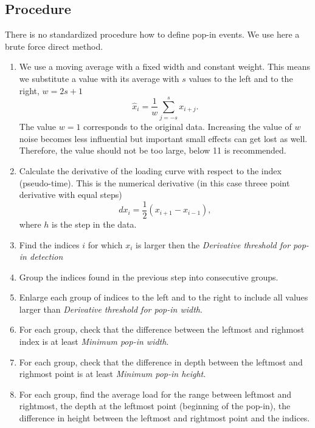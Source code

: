 \subsection{Procedure} \label{popin_calc}
There is no standardized procedure how to define pop-in events. We use here a brute force direct method. %
\begin{enumerate}
 \item 
We use a moving average with a fixed width and constant weight. This means we substitute a value with its average with $s$ values to the left and to the right, $w = 2s + 1$ 
$$
\hat{x} _i = \frac1w \sum_{j = -s}^{s} x_{i+j}.
$$
The value $w = 1$ corresponds to the original data. 
Increasing the value of $w$ noise becomes less influential but important small effects can get lost as well. 
Therefore, the value should not be too large, below 11 is recommended.
\item Calculate the derivative of the loading curve with respect to the index (pseudo-time). This is the numerical derivative (in this case threee point derivative with equal steps) 
$$
dx_i = \frac12(x_{i+1} - x_{i-1}), 
$$
where $h$ is the step in the data.
\item Find the indices $i$ for which $x_i$ is larger then the \emph{Derivative threshold for pop-in detection}
\item Group the indices found in the previous step into consecutive groups.
\item Enlarge each group of indices to the left and to the right to include all values larger than \emph{Derivative threshold for pop-in width}.
\item For each group, check that the difference between the leftmost and righmost index is at least \emph{Minimum pop-in width}.
\item For each group, check that the difference in depth between the leftmost and righmost point  is at least \emph{Minimum pop-in height}.
\item For each group, find the average load for the range between leftmost and rightmost, the depth at the leftmost point (beginning of the pop-in), the difference in height between the leftmost and rightmost point and the indices.
\end{enumerate}


